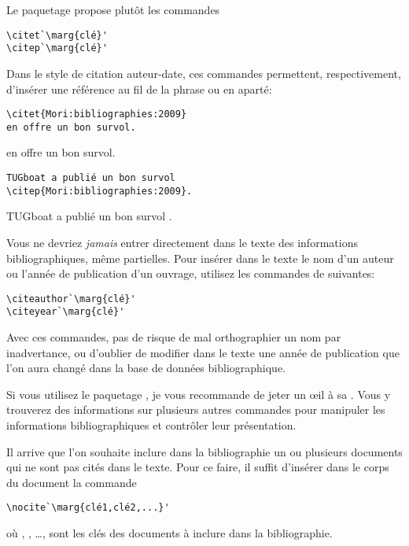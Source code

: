 Le paquetage  propose plutôt les commandes
\begin{lstlisting}
\citet`\marg{clé}'
\citep`\marg{clé}'
\end{lstlisting}
Dans le style de citation auteur-date, ces commandes permettent,
respectivement, d'insérer une référence au fil de la phrase ou en
aparté:
\begin{demo}
  \begin{texample}[0.55\linewidth]
\begin{lstlisting}
\citet{Mori:bibliographies:2009}
en offre un bon survol.
\end{lstlisting}
    \producing
    \citet{Mori:bibliographies:2009}
    en offre un bon survol.
  \end{texample}
  \begin{texample}[0.55\linewidth]
\begin{lstlisting}
TUGboat a publié un bon survol
\citep{Mori:bibliographies:2009}.
\end{lstlisting}
    \producing
    TUGboat a publié un bon survol
    \citep{Mori:bibliographies:2009}.
  \end{texample}
\end{demo}

Vous ne devriez \emph{jamais} entrer directement dans le texte des
informations bibliographiques, même partielles. Pour insérer dans le
texte le nom d'un auteur ou l'année de publication d'un ouvrage,
utilisez les commandes de  suivantes:
\begin{lstlisting}
\citeauthor`\marg{clé}'
\citeyear`\marg{clé}'
\end{lstlisting}
Avec ces commandes, pas de risque de mal orthographier un nom par
inadvertance, ou d'oublier de modifier dans le texte une année de
publication que l'on aura changé dans la base de données
bibliographique.

Si vous utilisez le paquetage , je vous recommande de
jeter un œil à sa %
. %
Vous y trouverez des informations sur plusieurs autres commandes pour
manipuler les informations bibliographiques et contrôler leur
présentation.

Il arrive que l'on souhaite inclure dans la bibliographie un ou
plusieurs documents qui ne sont pas cités dans le texte. Pour ce
faire, il suffit d'insérer dans le corps du document la commande
\begin{lstlisting}
\nocite`\marg{clé1,clé2,...}'
\end{lstlisting}
où , , \dots, sont les clés des documents à
inclure dans la bibliographie.

